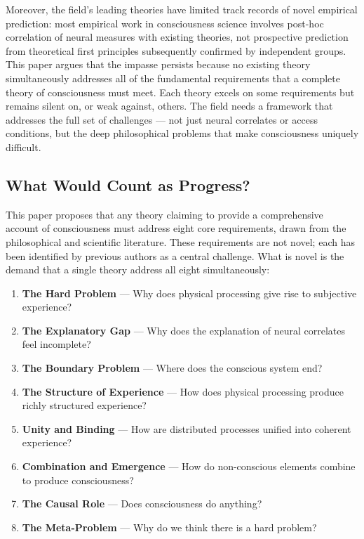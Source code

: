 \documentclass[12pt]{article}
\begin{document}
Moreover, the field's leading theories have limited track records of novel empirical prediction: most empirical work in consciousness science involves post-hoc correlation of neural measures with existing theories, not prospective prediction from theoretical first principles subsequently confirmed by independent groups. This paper argues that the impasse persists because no existing theory simultaneously addresses all of the fundamental requirements that a complete theory of consciousness must meet. Each theory excels on some requirements but remains silent on, or weak against, others. The field needs a framework that addresses the full set of challenges --- not just neural correlates or access conditions, but the deep philosophical problems that make consciousness uniquely difficult.


\subsection{What Would Count as Progress?}


This paper proposes that any theory claiming to provide a comprehensive account of consciousness must address eight core requirements, drawn from the philosophical and scientific literature. These requirements are not novel; each has been identified by previous authors as a central challenge. What is novel is the demand that a single theory address all eight simultaneously:

\begin{enumerate}
\item \textbf{The Hard Problem} \citep{Chalmers1995} --- Why does physical processing give rise to subjective experience?
\item \textbf{The Explanatory Gap} \citep{Levine1983} --- Why does the explanation of neural correlates feel incomplete?
\item \textbf{The Boundary Problem} \citep{Bayne2010,Tononi2004} --- Where does the conscious system end?
\item \textbf{The Structure of Experience} \citep{Nagel1974} --- How does physical processing produce richly structured experience?
\item \textbf{Unity and Binding} \citep{Treisman1980,Revonsuo1999} --- How are distributed processes unified into coherent experience?
\item \textbf{Combination and Emergence} \citep{Chalmers2016} --- How do non-conscious elements combine to produce consciousness?
\item \textbf{The Causal Role} \citep{Jackson1982} --- Does consciousness do anything?
\item \textbf{The Meta-Problem} \citep{Chalmers2018} --- Why do we think there is a hard problem?
\end{enumerate}
\end{document}
